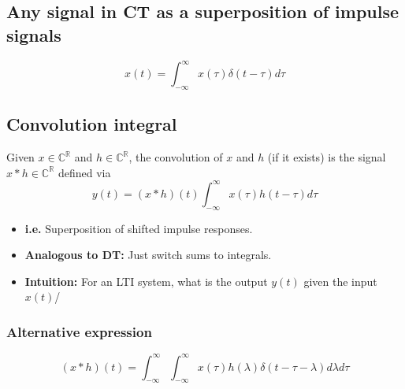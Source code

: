 \subsection{Any signal in CT as a superposition of impulse signals}
\begin{definition}
    \begin{equation}
        x(t)= \int_{-\infty}^{\infty} x(\tau) \delta (t-\tau) d\tau 
    \end{equation}
\end{definition}

\begin{derivation}
\end{derivation}

\subsection{Convolution integral}
\begin{definition}
    Given $x\in \mathbb{C}^{\mathbb{R}}$ and $h \in \mathbb{C}^{\mathbb{R}}$, the convolution of $x$ and $h$ (if it exists) is the signal $x \ast h \in \mathbb{C}^{\mathbb{R}}$ defined via 
    \begin{equation}
        y(t) = (x \ast h)(t) \int_{-\infty}^{\infty} x(\tau)h(t-\tau) d\tau 
    \end{equation}
    \begin{itemize}
        \item \textbf{i.e.} Superposition of shifted impulse responses. 
        \item \textbf{Analogous to DT:} Just switch sums to integrals. 
        \item \textbf{Intuition:} For an LTI system, what is the output $y(t)$ given the input $x(t)$/
    \end{itemize}
\end{definition}

\begin{derivation}
\end{derivation}

\subsubsection{Alternative expression}
\begin{definition}
    \[
(x * h)(t) = \int_{-\infty}^{\infty} \int_{-\infty}^{\infty} x(\tau) h(\lambda) \delta(t - \tau - \lambda) d\lambda d\tau
\]
\end{definition}


